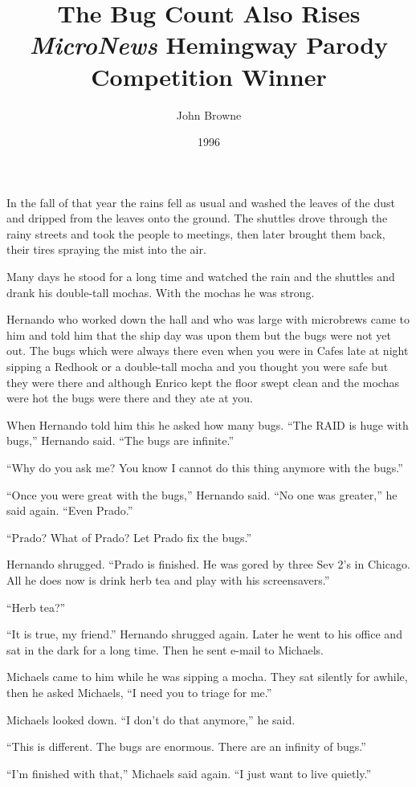 \documentclass[12pt,letterpaper]{article}
\title{The Bug Count Also Rises\\
\normalsize \textit{MicroNews} Hemingway Parody Competition Winner}
\author{John Browne}
\date{1996}
\begin{document}
\maketitle

In the fall of that year the rains fell as usual and washed
the leaves of the dust and dripped from the leaves onto the
ground. The shuttles drove through the rainy streets and took the
people to meetings, then later brought them back, their tires spraying
the mist into the air.

Many days he stood for a long time and watched
the rain and the shuttles and drank his double-tall mochas. With the
mochas he was strong.

Hernando who worked down the hall and who was large with microbrews
came to him and told him that the ship day was upon them but the bugs
were not yet out. The bugs which were always there even when you were
in Cafes late at night sipping a Redhook or a double-tall mocha and
you thought you were safe but they were there and although Enrico kept
the floor swept clean and the mochas were hot the bugs were there and
they ate at you.

When Hernando told him this he asked how many bugs.
``The RAID is huge with bugs,'' Hernando said. ``The bugs are infinite.''

``Why do you ask me? You know I cannot do this thing anymore with the
bugs.''

``Once you were great with the bugs,'' Hernando said. ``No one was
greater,'' he said again. ``Even Prado.''

``Prado? What of Prado? Let Prado fix the bugs.''

Hernando shrugged. ``Prado is finished. He was gored by three Sev 2's
in Chicago. All he does now is drink herb tea and play with his
screensavers.''

``Herb tea?''

``It is true, my friend.'' Hernando shrugged again.
Later he went to his office and sat in the dark for a long time. Then
he sent e-mail to Michaels.

Michaels came to him while he was sipping a mocha. They sat silently
for awhile, then he asked Michaels, ``I need you to triage for me.''

Michaels looked down. ``I don't do that anymore,'' he said.

``This is different. The bugs are enormous. There are an infinity of
bugs.''

``I'm finished with that,'' Michaels said again. ``I just want to live
quietly.''
\end{document}
